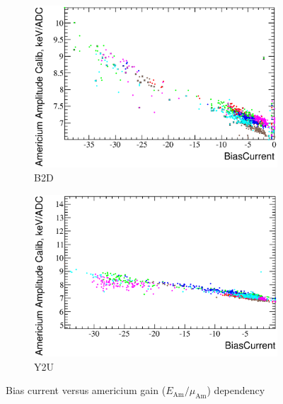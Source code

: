 \documentclass[a4paper]{article}
\begin{document}
\begin{figure}[p]
\begin{subfigure}[b]{0.5\textwidth}
\includegraphics[width=\textwidth]{gfx/run13_alpha_study/B2D/c_hBiasCurrent_AmAmpCoef.eps}
\caption{B2D}\label{bc_vs_gain-b2d}
\end{subfigure}
\begin{subfigure}[b]{0.5\textwidth}
\includegraphics[width=\textwidth]{gfx/run13_alpha_study/Y2U/c_hBiasCurrent_AmAmpCoef.eps}
\caption{Y2U}\label{bc_vs_gain-y2u}
\end{subfigure}

\caption{Bias current versus americium gain ($E_{\text{Am}} / \mu_{\text{Am}}$) dependency}
\label{fig:bc_vs_gain}
\end{figure}
\end{document}
